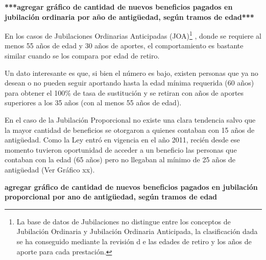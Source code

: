 \textbf{***agregar gráfico de cantidad de nuevos beneficios pagados en jubilación ordinaria por año de antigüedad, según tramos de edad***}

En los casos de Jubilaciones Ordinarias Anticipadas
(JOA)\footnote{La base de datos de Jubilaciones no distingue entre los conceptos de Jubilación Ordinaria y Jubilación Ordinaria Anticipada, la clasificación dada se ha conseguido mediante la revisión d
e las edades de retiro y los años de aporte para cada prestación.} ,
donde se requiere al menos 55 años de edad y 30 años de aportes, el
comportamiento es bastante similar cuando se los compara por edad de
retiro.

Un dato interesante es que, si bien el número es bajo, existen personas
que ya no desean o no pueden seguir aportando hasta la edad mínima
requerida (60 años) para obtener el 100\% de tasa de sustitución y se
retiran con años de aportes superiores a los 35 años (con al menos 55
años de edad).

En el caso de la Jubilación Proporcional no existe una clara tendencia
salvo que la mayor cantidad de beneficios se otorgaron a quienes
contaban con 15 años de antigüedad. Como la Ley entró en vigencia en el
año 2011, recién desde ese momento tuvieron oportunidad de acceder a un
beneficio las personas que contaban con la edad (65 años) pero no
llegaban al mínimo de 25 años de antigüedad (Ver Gráfico xx).

\textbf{agregar gráfico de cantidad de nuevos beneficios pagados en jubilación proporcional por ano de antigüedad, según tramos de edad}
